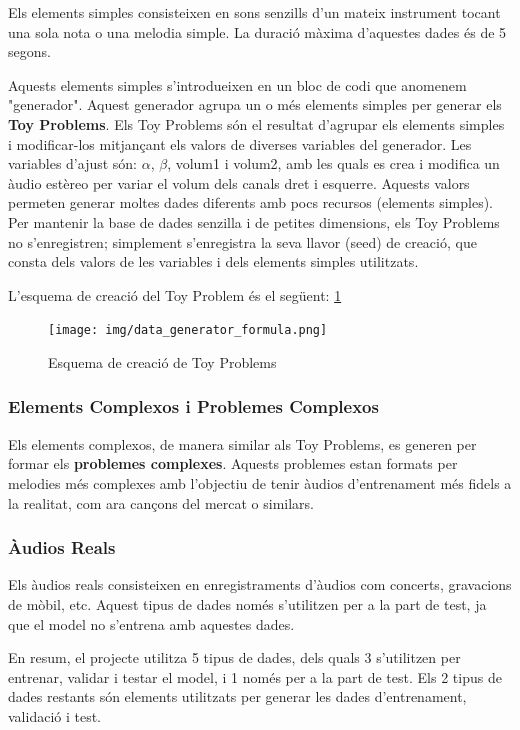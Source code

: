 \documentclass[10pt,a4paper,twocolumn,twoside]{article}
\begin{document}
Els elements simples consisteixen en sons senzills d'un mateix instrument tocant una sola nota o una melodia simple. La duració màxima d'aquestes dades és de 5 segons.

Aquests elements simples s'introdueixen en un bloc de codi que anomenem "generador". Aquest generador agrupa un o més elements simples per generar els \textbf{Toy Problems}. Els Toy Problems són el resultat d'agrupar els elements simples i modificar-los mitjançant els valors de diverses variables del generador. Les variables d'ajust són: \(\alpha\), \(\beta\), volum1 i volum2, amb les quals es crea i modifica un àudio estèreo per variar el volum dels canals dret i esquerre. Aquests valors permeten generar moltes dades diferents amb pocs recursos (elements simples). Per mantenir la base de dades senzilla i de petites dimensions, els Toy Problems no s'enregistren; simplement s'enregistra la seva llavor (seed) de creació, que consta dels valors de les variables i dels elements simples utilitzats.

L'esquema de creació del Toy Problem és el següent: \ref{fig:data-generator-formula}
\begin{figure}[h]
    \centering
    \texttt{[image: img/data\_generator\_formula.png]}
    \caption{Esquema de creació de Toy Problems}
    \label{fig:data-generator-formula}
\end{figure}

\subsubsection{Elements Complexos i Problemes Complexos}

Els elements complexos, de manera similar als Toy Problems, es generen per formar els \textbf{problemes complexes}. Aquests problemes estan formats per melodies més complexes amb l'objectiu de tenir àudios d'entrenament més fidels a la realitat, com ara cançons del mercat o similars.

\subsubsection{Àudios Reals}

Els àudios reals consisteixen en enregistraments d'àudios com concerts, gravacions de mòbil, etc. Aquest tipus de dades només s'utilitzen per a la part de test, ja que el model no s'entrena amb aquestes dades.

En resum, el projecte utilitza 5 tipus de dades, dels quals 3 s'utilitzen per entrenar, validar i testar el model, i 1 només per a la part de test. Els 2 tipus de dades restants són elements utilitzats per generar les dades d'entrenament, validació i test.
\end{document}
